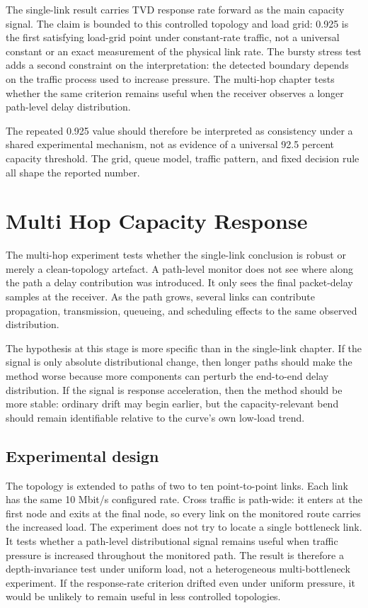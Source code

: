 \documentclass[a4paper,11pt]{report}
\begin{document}
The single-link result carries TVD response rate forward as the main capacity signal. The claim is bounded to this controlled topology and load grid: 0.925 is the first satisfying load-grid point under constant-rate traffic, not a universal constant or an exact measurement of the physical link rate. The bursty stress test adds a second constraint on the interpretation: the detected boundary depends on the traffic process used to increase pressure. The multi-hop chapter tests whether the same criterion remains useful when the receiver observes a longer path-level delay distribution.

The repeated 0.925 value should therefore be interpreted as consistency under a shared experimental mechanism, not as evidence of a universal 92.5 percent capacity threshold. The grid, queue model, traffic pattern, and fixed decision rule all shape the reported number.

\chapter{Multi Hop Capacity Response}
\label{sec:eval-multi-hop}

The multi-hop experiment tests whether the single-link conclusion is robust or merely a clean-topology artefact. A path-level monitor does not see where along the path a delay contribution was introduced. It only sees the final packet-delay samples at the receiver. As the path grows, several links can contribute propagation, transmission, queueing, and scheduling effects to the same observed distribution.

The hypothesis at this stage is more specific than in the single-link chapter. If the signal is only absolute distributional change, then longer paths should make the method worse because more components can perturb the end-to-end delay distribution. If the signal is response acceleration, then the method should be more stable: ordinary drift may begin earlier, but the capacity-relevant bend should remain identifiable relative to the curve's own low-load trend.

\section{Experimental design}

The topology is extended to paths of two to ten point-to-point links. Each link has the same 10 Mbit/s configured rate. Cross traffic is path-wide: it enters at the first node and exits at the final node, so every link on the monitored route carries the increased load. The experiment does not try to locate a single bottleneck link. It tests whether a path-level distributional signal remains useful when traffic pressure is increased throughout the monitored path. The result is therefore a depth-invariance test under uniform load, not a heterogeneous multi-bottleneck experiment. If the response-rate criterion drifted even under uniform pressure, it would be unlikely to remain useful in less controlled topologies.
\end{document}
